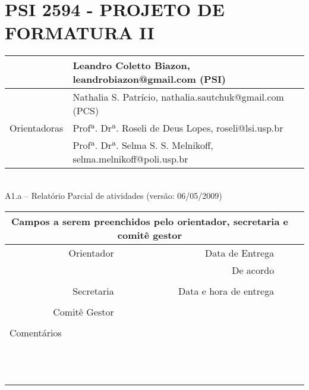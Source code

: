 \documentclass[a4paper,12pt,font=plain,header=plain]{abnt}
\begin{document}
\capa

\renewenvironment{center}{}{}
\chapter*{PSI 2594 - PROJETO DE FORMATURA II}

  \begin{tabular}[|l|]{ |r|l| }
    \hline
      & Leandro Coletto Biazon, leandrobiazon@gmail.com (PSI) \\
    \hline
      & Nathalia S. Patrício, nathalia.sautchuk@gmail.com (PCS) \\
    \hline
      Orientadoras & Profª. Drª. Roseli de Deus Lopes, roseli@lsi.usp.br \\
    \hline
      & Profª. Drª. Selma S. S. Melnikoff, selma.melnikoff@poli.usp.br \\
    \hline
  \end{tabular} \\

  A1.a – Relatório Parcial de atividades (versão: 06/05/2009) \\

  \begin{tabularx}{0.9\linewidth}{ |r|r|X|r| }
    \hline
      \multicolumn{3}{|c|}{Campos a serem preenchidos pelo orientador, secretaria e comitê gestor} \\
    \hline
      Orientador & Data de Entrega &  \\
    \hline
      & De acordo &  \\
    \hline
      & &  \\
    \hline
      Secretaria & Data e hora de entrega &  \\
    \hline
      &  &  \\
    \hline
      Comitê Gestor &  &  \\
    \hline
      &  &  \\
    \hline
      \multicolumn{3}{|l|}{Comentários} \\
        \multicolumn{3}{|l|}{} \\
        \multicolumn{3}{|l|}{} \\
        \multicolumn{3}{|l|}{} \\
        \multicolumn{3}{|l|}{} \\
        \multicolumn{3}{|l|}{} \\
        \multicolumn{3}{|l|}{} \\
        \multicolumn{3}{|l|}{} \\
        \multicolumn{3}{|l|}{} \\
        \multicolumn{3}{|l|}{} \\
        \multicolumn{3}{|l|}{} \\
        \multicolumn{3}{|l|}{} \\
        \multicolumn{3}{|l|}{} \\
    \hline
  \end{tabularx}
\end{document}
